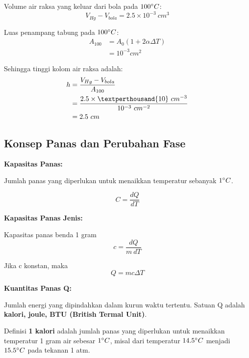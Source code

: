 \documentclass[twocolumn, 11pt]{article}%
\begin{document}
        Volume air raksa yang keluar dari bola pada $100 \degree C$:
        \begin{equation*}
            V_{Hg} - V_{bola} = 2.5 \times 10^{-3}\ cm^3
        \end{equation*}

        Luas penampang tabung pada $100 \degree C$:
        \begin{equation*}
            \begin{split}
                A_{100} &= A_0 (1+2\alpha \Delta T)\\
                &= 10^{-3} cm^2
            \end{split}
        \end{equation*}

        Sehingga tinggi kolom air raksa adalah:
        \begin{equation*}
            \begin{split}
                h &= \frac{V_{Hg} - V_{bola}}{A_{100}}\\
                &= \frac{2.5 \times \textperthousand{10}\ cm^{-3}}{10^{-3}\ cm^{-2}}\\
                &= 2.5\ cm
            \end{split}
        \end{equation*}

        \subsection{Konsep Panas dan Perubahan Fase}
        \textbf{Kapasitas Panas:}

        Jumlah panas yang diperlukan untuk menaikkan temperatur sebanyak $1\degree C$.

        \[ C = \frac{dQ}{dT} \]

        \textbf{Kapasitas Panas Jenis:}
        
        Kapasitas panas benda 1 gram
        \[c= \frac{dQ}{m\ dT} \]

        Jika c konstan, maka
        \[ Q=mc \Delta T \]

        \textbf{Kuantitas Panas Q:}

        Jumlah energi yang dipindahkan dalam kurun waktu tertentu. Satuan Q adalah \textbf{kalori, joule, BTU (British Termal Unit)}.

        Definisi \textbf{1 kalori} adalah jumlah panas yang diperlukan untuk menaikkan temperatur 1 gram air sebesar $1\degree C$, misal dari temperatur $14.5\degree C$ menjadi $15.5\degree C$ pada tekanan 1 atm.
\end{document}
